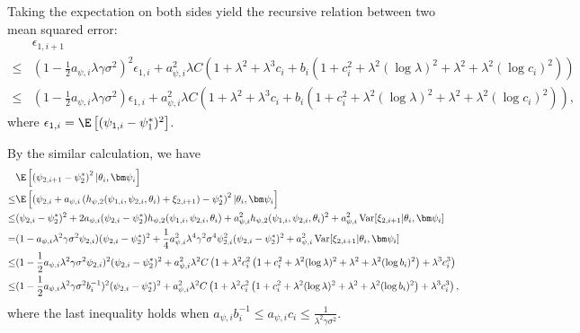 Taking the expectation on both sides yield the recursive relation between two mean squared error:
\begin{equation}
\label{eq:recursive error psi 1}
\begin{aligned}
& \epsilon_{1,i+1} \\
\leq & (1 - \frac{1}{2}a_{\psi,i}\lambda\gamma\sigma^2 )^2 \epsilon_{1,i} + a_{\psi,i}^2 \lambda C \left( 1 + \lambda^2 + \lambda^3 c_i + b_i(1 + c_i^2 + \lambda^2(\log\lambda)^2 + \lambda^2 + \lambda^2 (\log c_i)^2)  \right) \\
\leq & (1 - \frac{1}{2}a_{\psi,i}\lambda\gamma\sigma^2 ) \epsilon_{1,i} + a_{\psi,i}^2 \lambda C \left( 1 + \lambda^2 + \lambda^3 c_i + b_i(1 + c_i^2 + \lambda^2(\log\lambda)^2 + \lambda^2 + \lambda^2 (\log c_i)^2)  \right),
\end{aligned}
\end{equation}
where $\epsilon_{1,i} = \E\left[ (\psi_{1,i} - \psi_{1}^*)^2  \right]$.

By the similar calculation, we have
\[ \begin{aligned}
& \E\left[ \left( \psi_{2,i+1} - \psi_2^*\right)^2  | \theta_i,\bm\psi_i\right] \\
\leq &  \E\left[ \left(\psi_{2,i} + a_{\psi,i} \left( h_{\psi,2}(\psi_{1,i},\psi_{2,i},\theta_i) + \xi_{2,i+1} \right) - \psi_2^* \right)^2  | \theta_i,\bm\psi_i\right] \\
\leq & (\psi_{2,i} - \psi_2^*)^2 + 2a_{\psi,i}(\psi_{2,i} - \psi_2^*)h_{\psi,2}(\psi_{1,i},\psi_{2,i},\theta_i)  + a_{\psi,i}^2  h_{\psi,2}(\psi_{1,i},\psi_{2,i},\theta_i)^2 + a_{\psi,i}^2 \operatorname{Var}[\xi_{2,i+1}|\theta_i,\bm\psi_i] \\
= & (1 - a_{\psi,i}\lambda^2\gamma\sigma^2\psi_{2,i} ) (\psi_{2,i} - \psi_2^*)^2 + \frac{1}{4}a_{\psi,i}^2\lambda^4\gamma^2\sigma^4\psi_{2,i}^2(\psi_{2,i} - \psi_2^*)^2 +  a_{\psi,i}^2 \operatorname{Var}[\xi_{2,i+1}|\theta_i,\bm\psi_i]\\
\leq & (1 - \frac{1}{2}a_{\psi,i}\lambda^2\gamma\sigma^2 \psi_{2,i})^2 (\psi_{2,i} - \psi_2^*)^2 + a_{\psi,i}^2\lambda^2 C \left( 1 + \lambda^2c_i^2 \left( 1 + c_i^2 + \lambda^2(\log\lambda)^2 + \lambda^2 + \lambda^2(\log b_i)^2\right)  +  \lambda^3c_i^3 \right) \\
\leq & (1 - \frac{1}{2}a_{\psi,i}\lambda^2\gamma\sigma^2 b_i^{-1})^2 (\psi_{2,i} - \psi_2^*)^2 + a_{\psi,i}^2\lambda^2 C \left( 1 + \lambda^2c_i^2 \left( 1 + c_i^2 + \lambda^2(\log\lambda)^2 + \lambda^2 + \lambda^2(\log b_i)^2\right)  +  \lambda^3c_i^3 \right) ,
\end{aligned}\]
where the last inequality holds when $a_{\psi,i}b_i^{-1} \leq a_{\psi,i}c_i \leq \frac{1}{\lambda^2\gamma\sigma^2} $. 

